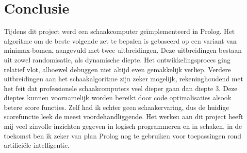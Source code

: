 \chapter{Conclusie}
Tijdens dit project werd een schaakcomputer ge\"implementeerd in Prolog. Het algoritme om de beste volgende zet te bepalen is gebaseerd op een variant van minimax-bomen, aangevuld met twee uitbreidingen. Deze uitbreidingen bestaan uit zowel randomisatie, als dynamische diepte. Het ontwikkelingsproces ging relatief vlot, alhoewel debuggen niet altijd even gemakkelijk verliep. Verdere uitbreidingen aan het schaakalgoritme zijn zeker mogelijk, rekeninghoudend met het feit dat professionele schaakcomputers veel dieper gaan dan diepte 3. Deze dieptes kunnen voornamelijk worden bereikt door code optimalisaties alsook betere score functies. Zelf had ik echter geen schaakervaring, dus de huidige scorefunctie leek de meest voordehandliggende. Het werken aan dit project heeft mij veel zinvolle inzichten gegeven in logisch programmeren en in schaken, in de toekomst ben ik zeker van plan Prolog nog te gebruiken voor toepassingen rond artifici\"ele intelligentie.